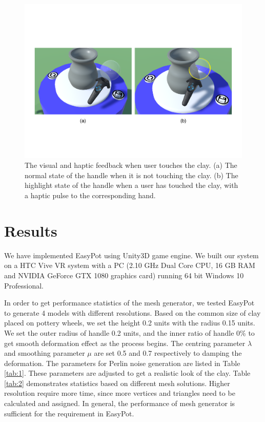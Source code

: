 \documentclass{svjour3}                     %
\begin{document}
\begin{figure}
\includegraphics[width=\textwidth]{highlight}
\caption{The visual and haptic feedback when user touches the clay. (a) The normal state of the handle when it is not touching the clay. (b) The highlight state of the handle when a user has touched the clay, with a haptic pulse to the corresponding hand.}
\label{fig:highlight}
\end{figure}


\section{Results}
\label{sec:5}

We have implemented EasyPot using Unity3D\cite{website:unity} game engine. We built our system on a HTC Vive\cite{website:vive} VR system with a PC (2.10 GHz Dual Core CPU, 16 GB RAM and NVIDIA GeForce GTX 1080 graphics card) running 64 bit Windows 10 Professional.

In order to get performance statistics of the mesh generator, we tested EasyPot to generate 4 models with different resolutions.
Based on the common size of clay placed on pottery wheels, we set the height 0.2 units with the radius 0.15 units.
We set the outer radius of handle 0.2 units, and the inner ratio of handle 0\% to get smooth deformation effect as the process begins. The centring parameter $\lambda$ and smoothing parameter $\mu$ are set 0.5 and 0.7 respectively to damping the deformation. The parameters for Perlin noise generation are listed in Table \ref{tab:1}. These parameters are adjusted to get a realistic look of the clay.
Table \ref{tab:2} demonstrates statistics based on different mesh solutions. Higher resolution require more time, since more vertices and triangles need to be calculated and assigned. In general, the performance of mesh generator is sufficient for the requirement in EasyPot.
\end{document}
